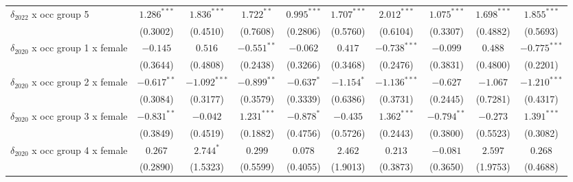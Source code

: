 \begin{tabular}{l|ccc|ccc|ccc}
$\delta_{2022}$ x occ group 5          &           $1.286^{***}$ &   $1.836^{***}$ &    $1.722^{**}$ &            $0.995^{***}$ &   $1.707^{***}$ &   $2.012^{***}$ &            $1.075^{***}$ &   $1.698^{***}$ &   $1.855^{***}$ \\
                                       &                (0.3002) &        (0.4510) &        (0.7608) &                 (0.2806) &        (0.5760) &        (0.6104) &                 (0.3307) &        (0.4882) &        (0.5693) \\
$\delta_{2020}$ x occ group 1 x female &                $-0.145$ &         $0.516$ &   $-0.551^{**}$ &                 $-0.062$ &         $0.417$ &  $-0.738^{***}$ &                 $-0.099$ &         $0.488$ &  $-0.775^{***}$ \\
                                       &                (0.3644) &        (0.4808) &        (0.2438) &                 (0.3266) &        (0.3468) &        (0.2476) &                 (0.3831) &        (0.4800) &        (0.2201) \\
$\delta_{2020}$ x occ group 2 x female &           $-0.617^{**}$ &  $-1.092^{***}$ &   $-0.899^{**}$ &               $-0.637^*$ &      $-1.154^*$ &  $-1.136^{***}$ &                 $-0.627$ &        $-1.067$ &  $-1.210^{***}$ \\
                                       &                (0.3084) &        (0.3177) &        (0.3579) &                 (0.3339) &        (0.6386) &        (0.3731) &                 (0.2445) &        (0.7281) &        (0.4317) \\
$\delta_{2020}$ x occ group 3 x female &           $-0.831^{**}$ &        $-0.042$ &   $1.231^{***}$ &               $-0.878^*$ &        $-0.435$ &   $1.362^{***}$ &            $-0.794^{**}$ &        $-0.273$ &   $1.391^{***}$ \\
                                       &                (0.3849) &        (0.4519) &        (0.1882) &                 (0.4756) &        (0.5726) &        (0.2443) &                 (0.3800) &        (0.5523) &        (0.3082) \\
$\delta_{2020}$ x occ group 4 x female &                 $0.267$ &       $2.744^*$ &         $0.299$ &                  $0.078$ &         $2.462$ &         $0.213$ &                 $-0.081$ &         $2.597$ &         $0.268$ \\
                                       &                (0.2890) &        (1.5323) &        (0.5599) &                 (0.4055) &        (1.9013) &        (0.3873) &                 (0.3650) &        (1.9753) &        (0.4688) \\

\end{tabular}
